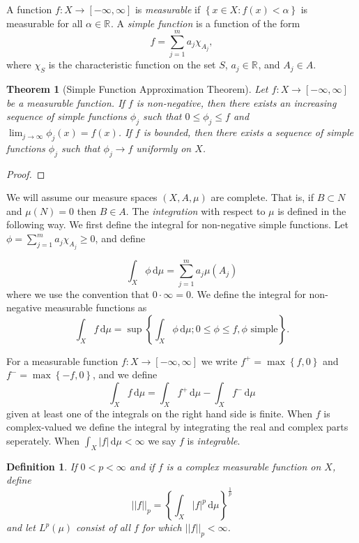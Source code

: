 \documentclass[12pt]{report}
\newtheorem{theorem}{Theorem}[section]
\newtheorem{definition}{Definition}
\numberwithin{definition}{section}
\begin{document}
A function $ f : X \to [-\infty, \infty] $ is \textit{measurable} if $ \left\{ x \in X : f(x) < \alpha \right\}$ is measurable for all $\alpha \in \mathbb{R}^{} $.
A \textit{simple function}  is a function of the form
\[
f = \sum_{j=1}^m a_{j}\chi_{A_{j}} 
,\] 
where $\chi_{S}$ is the characteristic function on the set $S$, $a_{j} \in \mathbb{R}^{} $, and $A_{j} \in A$.

\begin{theorem}[Simple Function Approximation Theorem]
  Let $ f : X \to [-\infty, \infty] $ be a measurable function.
  If $f$ is non-negative, then there exists an increasing sequence of simple functions $\phi_{j}$ such that $0 \leq \phi_{j} \leq f$ and $\lim_{j \to \infty} \phi_{j}(x) = f(x)$.
  If $f$ is bounded, then there exists a sequence of simple functions $\phi_{j}$ such that $\phi_{j} \to f$ uniformly on $X$.
\end{theorem}

\begin{proof}
\end{proof}

We will assume our measure spaces $(X,A,\mu)$ are complete.
That is, if $B \subset N$ and $\mu(N) = 0$ then $B \in A$.
The \textit{integration} with respect to $\mu$ is defined in the following way.
We first define the integral for non-negative simple functions.
Let $\phi = \sum_{j=1}^m a_{j} \chi_{A_{j}} \geq 0$, and define 

\[
\int_{ X} \! \phi \, \mathrm{d}\mu = \sum_{j=1}^m a_{j} \mu(A_{j})
\] 
where we use the convention that $0 \cdot \infty = 0$.
We define the integral for non-negative measurable functions as
\[
  \int_{ X} \! f \, \mathrm{d}\mu = \sup \left\{ \int_{ X} \! \phi \, \mathrm{d}\mu ; 0 \leq \phi \leq f, \phi \text{ simple}  \right\} 
.\] 

For a measurable function $ f : X \to [-\infty,\infty] $ we write $f^{+} = \max \left\{ f,0 \right\}$ and $f^{-} = \max \left\{ -f,0 \right \}$, and we define
\[
\int_{ X} \! f \, \mathrm{d}\mu = \int_{ X} \! f^{+} \, \mathrm{d}\mu - \int_{ X} \! f^{-} \, \mathrm{d}\mu  
\] 
given at least one of the integrals on the right hand side is finite.
When $f$ is complex-valued we define the integral by integrating the real and complex parts seperately.
When $\int_{ X} \! |f| \, \mathrm{d}\mu < \infty $ we say $f$ is \textit{integrable}.

\begin{definition}
  If $0 < p < \infty$ and if $f$ is a complex measurable function on $X$, define
  \[
    ||f||_{p} = \left\{ \int_{ X} \! |f|^{p} \, \mathrm{d}\mu  \right\}^{\frac{1}{p}}
  \] 
  and let $L^{p}(\mu)$ consist of all $f$ for which $||f||_{p} < \infty$.
\end{definition}
\end{document}
